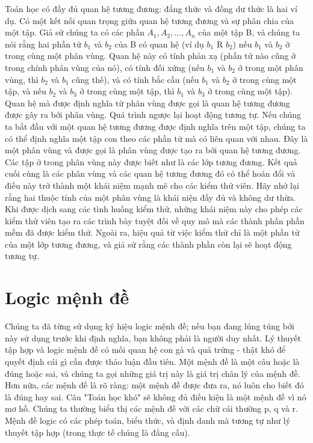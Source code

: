 \documentclass[11pt,a4paper,oneside]{article}
\begin{document}
Toán học có đầy đủ quan hệ tương đương: đẳng thức và đồng dư thức là hai ví dụ. Có một kết nối quan trọng giữa quan hệ tương đương và sự phân chia của một tập. Giả sử chúng ta có các phần $ A_{1}, A_{2}, …, A_{n} $ của một tập B, và chúng ta nói rằng hai phần tử $b_{1}$ và $b_{2}$ của B có quan hệ (ví dụ $b_{1}$ R $b_{2}$) nếu $b_{1}$ và $b_{2}$ ở trong cùng một phân vùng. Quan hệ này có tính phản xạ (phần tử nào cũng ở trong chính phân vùng của nó), có tính đối xứng (nếu $b_{1}$ và $b_{2}$ ở trong một phân vùng, thì $b_{2}$ và $b_{1}$ cũng thế), và có tính bắc cầu (nếu $b_{1}$ và $b_{2}$ ở trong cùng một tập, và nếu $b_{2}$ và $b_{3}$ ở trong cùng một tập, thì $b_{1}$ và $b_{3}$ ở trong cùng một tập). Quan hệ mà được định nghĩa từ phân vùng được gọi là quan hệ tương đương được gây ra bởi phân vùng. Quá trình ngược lại hoạt động tương tự. Nếu chúng ta bắt đầu với một quan hệ tương đương được định nghĩa trên một tập, chúng ta có thể định nghĩa một tập con theo các phần tử mà có liên quan với nhau. Đây là một phân vùng và được gọi là phân vùng được tạo ra bởi quan hệ tương đương. Các tập ở trong phân vùng này được biết như là các lớp tương đương. Kết quả cuối cùng là các phân vùng và các quan hệ tương đương đó có thể hoán đổi và điều này trở thành một khái niệm mạnh mẽ cho các kiểm thử viên. Hãy nhớ lại rằng hai thuộc tính của một phân vùng là khái niện đầy đủ và không dư thừa. Khi được dịch sang các tình huống kiểm thử, những khái niệm này cho phép các kiểm thử viên tạo ra các trình bày tuyệt đối về quy mô mà các thành phần phần mềm đã được kiểm thử. Ngoài ra, hiệu quả từ việc kiểm thử chỉ là một phần tử của một lớp tương đương, và giả sử rằng các thành phần còn lại sẽ hoạt động tương tự.

\section{Logic mệnh đề}
Chúng ta đã từng sử dụng ký hiệu logic mệnh đề; nếu bạn đang lúng túng bởi này sử dụng trước khi định nghĩa, bạn không phải là người duy nhất. Lý thuyết tập hợp và logic mệnh đề có mối quan hệ con gà và quả trứng - thật khó để quyết định cái gì cần được thảo luận đầu tiên. Một mệnh đề là một câu hoặc là đúng hoặc sai, và chúng ta gọi những giá trị này là giá trị chân lý của mệnh đề. Hơn nữa, các mệnh đề là rõ ràng: một mệnh đề được đưa ra, nó luôn cho biết đó là đúng hay sai. Câu "Toán học khó" sẽ không đủ điều kiện là một mệnh đề vì nó mơ hồ. Chúng ta thường biểu thị các mệnh đề với các chữ cái thường p, q và r. Mệnh đề logic có các phép toán, biểu thức, và định danh mà tương tự như lý thuyết tập hợp (trong thực tế chúng là đẳng cấu).
\end{document}
